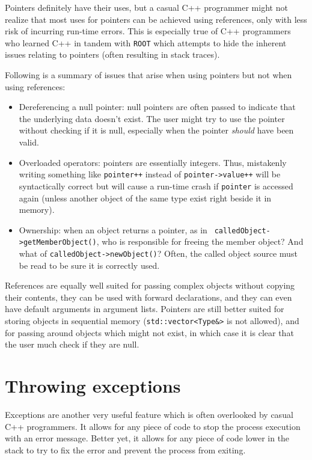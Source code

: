 \documentclass[10pt,a4paper]{book}
\newcommand{\ROOT}{\Verb`ROOT` }
\begin{document}
Pointers definitely have their uses, but a casual C++ programmer might not realize that most uses for pointers can be achieved using references, only with less risk of incurring run-time errors. This is especially true of C++ programmers who learned C++ in tandem with \ROOT which attempts to hide the inherent issues relating to pointers (often resulting in stack traces).

Following is a summary of issues that arise when using pointers but not when using references:

\begin{itemize}
	\item Dereferencing a null pointer: null pointers are often passed to indicate that the underlying data doesn't exist. The user might try to use the pointer without checking if it is null, especially when the pointer \emph{should} have been valid.
	\item Overloaded operators: pointers are essentially integers. Thus, mistakenly writing something like \Verb`pointer++` instead of \Verb`pointer->value++` will be syntactically correct but will cause a run-time crash if \Verb`pointer` is accessed again (unless another object of the same type exist right beside it in memory).
	\item Ownership: when an object returns a pointer, as in \Verb` calledObject->getMemberObject()`, who is responsible for freeing the member object? And what of \Verb`calledObject->newObject()`? Often, the called object source must be read to be sure it is correctly used.
\end{itemize}

References are equally well suited for passing complex objects without copying their contents, they can be used with forward declarations, and they can even have default arguments in argument lists. Pointers are still better suited for storing objects in sequential memory (\Verb`std::vector<Type&>` is not allowed), and for passing around objects which might not exist, in which case it is clear that the user much check if they are null.

\section{Throwing exceptions}

Exceptions are another very useful feature which is often overlooked by casual C++ programmers. It allows for any piece of code to stop the process execution with an error message. Better yet, it allows for any piece of code lower in the stack to try to fix the error and prevent the process from exiting.
\end{document}
